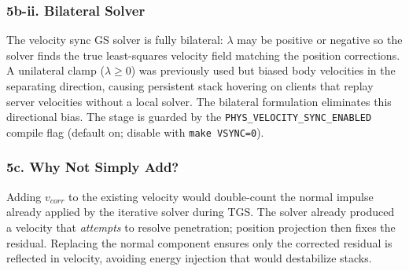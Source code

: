 \subsubsection*{5b-ii. Bilateral Solver}
The velocity sync GS solver is fully bilateral: $\lambda$ may be positive or negative so the solver finds the true least-squares velocity field matching the position corrections. A unilateral clamp ($\lambda \geq 0$) was previously used but biased body velocities in the separating direction, causing persistent stack hovering on clients that replay server velocities without a local solver. The bilateral formulation eliminates this directional bias. The stage is guarded by the \texttt{PHYS\_VELOCITY\_SYNC\_ENABLED} compile flag (default on; disable with \texttt{make VSYNC=0}).

\subsubsection*{5c. Why Not Simply Add?}
Adding $v_{corr}$ to the existing velocity would double-count the normal impulse already applied by the iterative solver during TGS. The solver already produced a velocity that \textit{attempts} to resolve penetration; position projection then fixes the residual. Replacing the normal component ensures only the corrected residual is reflected in velocity, avoiding energy injection that would destabilize stacks.

